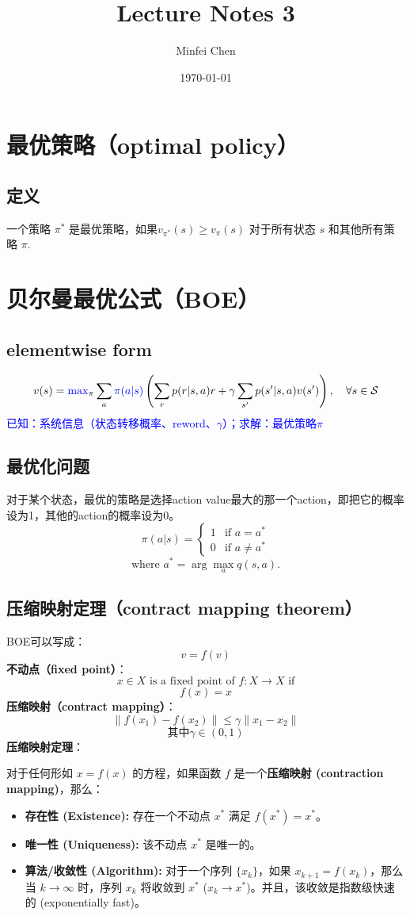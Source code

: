 \documentclass{article}
\begin{document}
\title{Lecture Notes 3}
\author{Minfei Chen}
\date{\today}
\maketitle
\section{最优策略（optimal policy）}
\subsection{定义}
一个策略 $\pi^*$ 是最优策略，如果$v_{\pi^*}(s) \ge v_{\pi}(s)$ 对于所有状态 $s$ 和其他所有策略 $\pi$.
\section{贝尔曼最优公式（BOE）}
\subsection{elementwise form}
$$
v(s) = \textcolor{blue}{\max}_{\pi} \sum_{a} \textcolor{blue}{\pi(a|s)} \left( \sum_{r} p(r|s, a)r + \gamma \sum_{s'} p(s'|s, a)v(s') \right), \quad \forall s \in \mathcal{S}
$$
\textcolor{blue}{\kaishu*已知：系统信息（状态转移概率、reword、$\gamma$）；求解：最优策略$\pi$}
\subsection{最优化问题}
对于某个状态，最优的策略是选择action value最大的那一个action，即把它的概率设为1，其他的action的概率设为0。
$$
\pi(a|s) =
\begin{cases}
  1 & \text{if } a = a^* \\
  0 & \text{if } a \neq a^* 
\end{cases}
$$
$$
\text{where } a^* = \arg\max_{a} q(s, a).
$$
\subsection{压缩映射定理（contract mapping theorem）}
BOE可以写成：
$$
v = f(v)
$$
\textbf{不动点（fixed point）}：
$$x \in X \text{ is a fixed point of } f : X \to X \text{ if}$$
\[
f(x) = x
\]
\textbf{压缩映射（contract mapping）}：
$$\|f(x_1) - f(x_2)\| \le \gamma \|x_1 - x_2\|$$
$$\text{其中} \gamma \in (0, 1)$$
\textbf{压缩映射定理}：

对于任何形如 $x = f(x)$ 的方程，如果函数 $f$ 是一个\textbf{压缩映射 (contraction mapping)}，那么：
\begin{itemize}
    \item \textbf{存在性 (Existence):} 存在一个不动点 $x^*$ 满足 $f(x^*) = x^*$。
    \item \textbf{唯一性 (Uniqueness):} 该不动点 $x^*$ 是唯一的。
    \item \textbf{算法/收敛性 (Algorithm):} 对于一个序列 $\{x_k\}$，如果 $x_{k+1} = f(x_k)$，那么当 $k \to \infty$ 时，序列 $x_k$ 将收敛到 $x^*$ ($x_k \to x^*$)。并且，该收敛是指数级快速的 (exponentially fast)。
\end{itemize}
\end{document}
